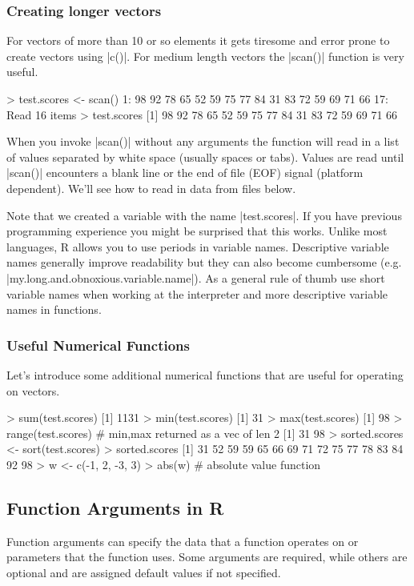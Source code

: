 \subsubsection{Creating longer vectors}

For vectors of more than 10 or so elements it gets tiresome and error
prone to create vectors using |c()|. For medium length vectors
the |scan()| function is very useful.
%
\begin{R}
> test.scores <- scan()
1: 98 92 78 65 52 59 75 77 84 31 83 72 59 69 71 66
17:
Read 16 items
> test.scores
 [1] 98 92 78 65 52 59 75 77 84 31 83 72 59 69 71 66
\end{R}
%
When you invoke |scan()| without any arguments the function
will read in a list of values separated by white space (usually spaces
or tabs). Values are read until |scan()| encounters a blank
line or the end of file (EOF) signal (platform dependent). We'll see how to read in data from files below.

Note that we created a variable with the name |test.scores|.
If you have previous programming experience you might be surprised that
this works. Unlike most languages, R allows you to use periods in
variable names. Descriptive variable names generally improve readability
but they can also become cumbersome (e.g.
|my.long.and.obnoxious.variable.name|). As a general rule of
thumb use short variable names when working at the interpreter and more
descriptive variable names in functions.

\subsubsection{Useful Numerical Functions}

Let's introduce some additional numerical functions that are useful for
operating on vectors.
%
\begin{R}
> sum(test.scores)
[1] 1131
> min(test.scores)
[1] 31
> max(test.scores)
[1] 98
> range(test.scores) # min,max returned as a vec of len 2
[1] 31 98
> sorted.scores <- sort(test.scores)
> sorted.scores
 [1] 31 52 59 59 65 66 69 71 72 75 77 78 83 84 92 98
> w <- c(-1, 2, -3, 3)
> abs(w) # absolute value function
\end{R}

\subsection{Function Arguments in R}

Function arguments can specify the data that a function operates on or
parameters that the function uses. Some arguments are required, while
others are optional and are assigned default values if not specified.


